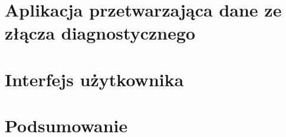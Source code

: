 \documentclass[12pt]{article} %
\numberwithin{equation}{subsection}
\numberwithin{figure}{section}
\numberwithin{table}{section}
\begin{document}
\section{Aplikacja przetwarzająca dane ze złącza diagnostycznego}
	\hspace{0.5cm}
	
	\newpage
	
	
\section{Interfejs użytkownika}
	\hspace{0.5cm}
	
	\newpage
	
\section{Podsumowanie}
	
	\hspace{0.5cm} 
	
	\newpage	
	
\end{document}
